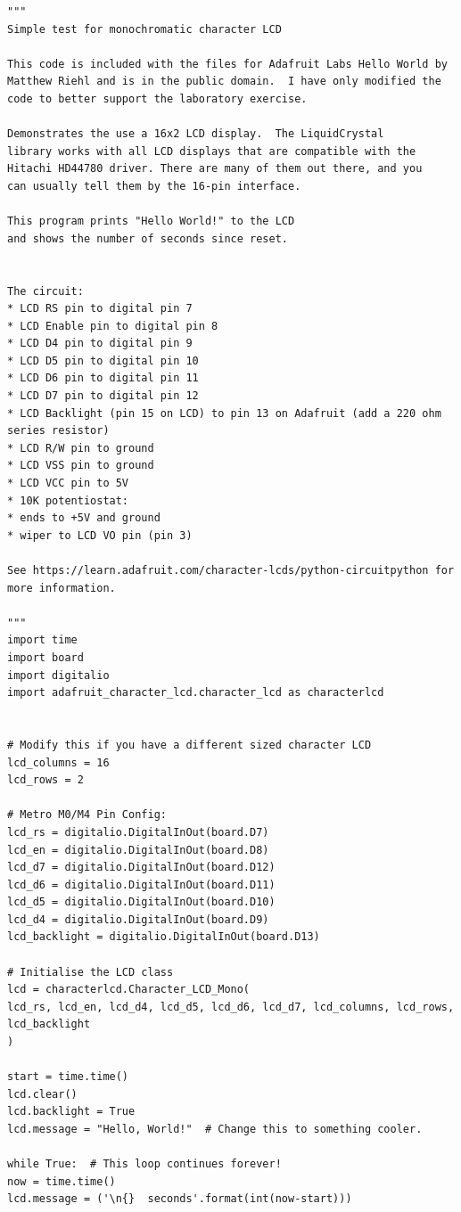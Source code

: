 \documentclass[]{article}
\begin{document}
\begin{verbatim}
"""
Simple test for monochromatic character LCD

This code is included with the files for Adafruit Labs Hello World by 
Matthew Riehl and is in the public domain.  I have only modified the
code to better support the laboratory exercise.

Demonstrates the use a 16x2 LCD display.  The LiquidCrystal
library works with all LCD displays that are compatible with the
Hitachi HD44780 driver. There are many of them out there, and you
can usually tell them by the 16-pin interface.

This program prints "Hello World!" to the LCD
and shows the number of seconds since reset.


The circuit:
* LCD RS pin to digital pin 7
* LCD Enable pin to digital pin 8
* LCD D4 pin to digital pin 9
* LCD D5 pin to digital pin 10
* LCD D6 pin to digital pin 11
* LCD D7 pin to digital pin 12
* LCD Backlight (pin 15 on LCD) to pin 13 on Adafruit (add a 220 ohm series resistor)
* LCD R/W pin to ground
* LCD VSS pin to ground
* LCD VCC pin to 5V
* 10K potentiostat:
* ends to +5V and ground
* wiper to LCD VO pin (pin 3)

See https://learn.adafruit.com/character-lcds/python-circuitpython for more information.

"""
import time
import board
import digitalio
import adafruit_character_lcd.character_lcd as characterlcd


# Modify this if you have a different sized character LCD
lcd_columns = 16
lcd_rows = 2

# Metro M0/M4 Pin Config:
lcd_rs = digitalio.DigitalInOut(board.D7)
lcd_en = digitalio.DigitalInOut(board.D8)
lcd_d7 = digitalio.DigitalInOut(board.D12)
lcd_d6 = digitalio.DigitalInOut(board.D11)
lcd_d5 = digitalio.DigitalInOut(board.D10)
lcd_d4 = digitalio.DigitalInOut(board.D9)
lcd_backlight = digitalio.DigitalInOut(board.D13)

# Initialise the LCD class
lcd = characterlcd.Character_LCD_Mono(
lcd_rs, lcd_en, lcd_d4, lcd_d5, lcd_d6, lcd_d7, lcd_columns, lcd_rows, lcd_backlight
)

start = time.time()
lcd.clear()
lcd.backlight = True 
lcd.message = "Hello, World!"  # Change this to something cooler.

while True:  # This loop continues forever!
now = time.time()
lcd.message = ('\n{}  seconds'.format(int(now-start)))
\end{verbatim}
\end{document}
